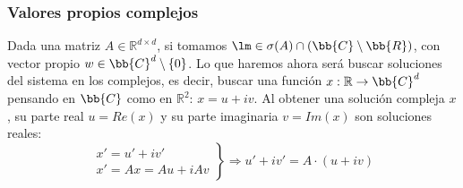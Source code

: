 \subsubsection{Valores propios complejos}
Dada una matriz $A\in \mathbb{R}^{d\times d}$, si tomamos $\lm \in \sigma(A)\cap (\bb{C}\setminus\bb{R})$, con vector propio $w\in \bb{C}^d\setminus \{0\}$. Lo que haremos ahora será buscar soluciones del sistema en los complejos, es decir, buscar una función $x:\mathbb{R}\rightarrow\bb{C}^d$ pensando en $\bb{C}$ como en $\mathbb{R}^2$: $x = u + iv$. Al obtener una solución compleja $x$, su parte real $u = Re(x)$ y su parte imaginaria $v = Im(x)$ son soluciones reales:
\begin{equation*}
    \left.\begin{array}{r}
        x' = u' + iv' \\
        x' = Ax = Au + iAv
    \end{array}\right\} \Longrightarrow u' + iv' = A\cdot (u+iv)
\end{equation*}

